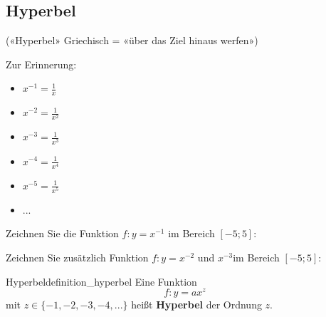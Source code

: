 

\newpage

\subsection{Hyperbel}
(«Hyperbel» Griechisch = «über das Ziel hinaus werfen»)


Zur Erinnerung:
\begin{multicols}{2}
\begin{itemize}
	\item $x^{-1} = \frac{1}{x}$
	\item $x^{-2} = \frac{1}{x^2}$
	\item $x^{-3} = \frac{1}{x^3}$
	\item $x^{-4} = \frac{1}{x^4}$
	\item $x^{-5} = \frac{1}{x^5}$
  \item ...
\end{itemize}
\end{multicols}

Zeichnen Sie die Funktion $f: y = x^{-1}$ im Bereich $[-5;5]$:


\newpage


Zeichnen Sie zusätzlich Funktion $f: y = x^{-2}$  und $x^{-3}$im Bereich $[-5;5]$:


\begin{definition}{Hyperbel}{definition_hyperbel}
  Eine Funktion $$f: y=ax^z$$
  mit $z \in \{-1, -2, -3, -4, ...\}$ heißt
\textbf{Hyperbel} der Ordnung $z$.
\end{definition}

